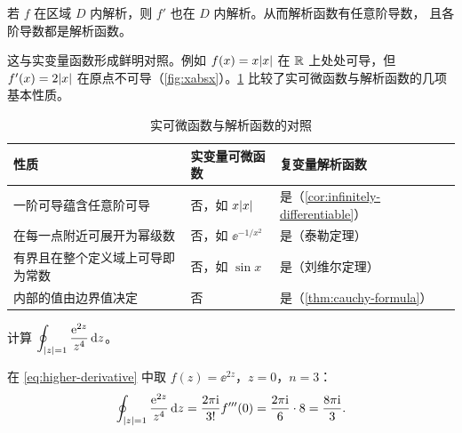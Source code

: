 \documentclass{mojing-notes}
\begin{document}
\begin{corollary}\label{cor:infinitely-differentiable}
若 $f$ 在区域 $D$ 内解析，则 $f'$ 也在 $D$ 内解析。从而解析函数有任意阶导数，
且各阶导数都是解析函数。
\end{corollary}

\begin{marginfigure}[-2\baselineskip]
\caption{$x\abs{x}$（实线）可导，其导数 $2\abs{x}$（虚线）在原点不可导}
\label{fig:xabsx}
\end{marginfigure}

这与实变量函数形成鲜明对照。例如 $f(x)=x\lvert x\rvert$ 在 $\mathbb{R}$ 上处处可导，但
$f'(x)=2\lvert x\rvert$ 在原点不可导（\cref{fig:xabsx}）。\cref{tab:real-vs-complex}
比较了实可微函数与解析函数的几项基本性质。

\begin{table}[htbp]
\centering
\caption{实可微函数与解析函数的对照}\label{tab:real-vs-complex}
\begin{tabular}{@{}lll@{}}
\toprule
性质 & 实变量可微函数 & 复变量解析函数 \\
\midrule
一阶可导蕴含任意阶可导       & 否，如 $x\abs{x}$         & 是（\cref{cor:infinitely-differentiable}） \\
在每一点附近可展开为幂级数 & 否，如 $\ee^{-1/x^2}$     & 是（泰勒定理） \\
有界且在整个定义域上可导即为常数 & 否，如 $\sin x$     & 是（刘维尔定理） \\
内部的值由边界值决定         & 否                        & 是（\cref{thm:cauchy-formula}） \\
\bottomrule
\end{tabular}
\end{table}

\begin{example}
计算 $\displaystyle\oint_{\lvert z\rvert=1}\frac{\mathrm{e}^{2z}}{z^4}\mathop{}\!\mathrm{d} z$。
\end{example}

\begin{solution}
在 \cref{eq:higher-derivative} 中取 $f(z)=\ee^{2z}$，$z=0$，$n=3$：
\[
  \oint_{\lvert z\rvert=1}\frac{\mathrm{e}^{2z}}{z^4}\mathop{}\!\mathrm{d} z=\frac{2\pi\mathrm{i}}{3!}f'''(0)
  =\frac{2\pi\mathrm{i}}{6}\cdot 8=\frac{8\pi\mathrm{i}}{3}.
\]
\end{solution}
\end{document}
